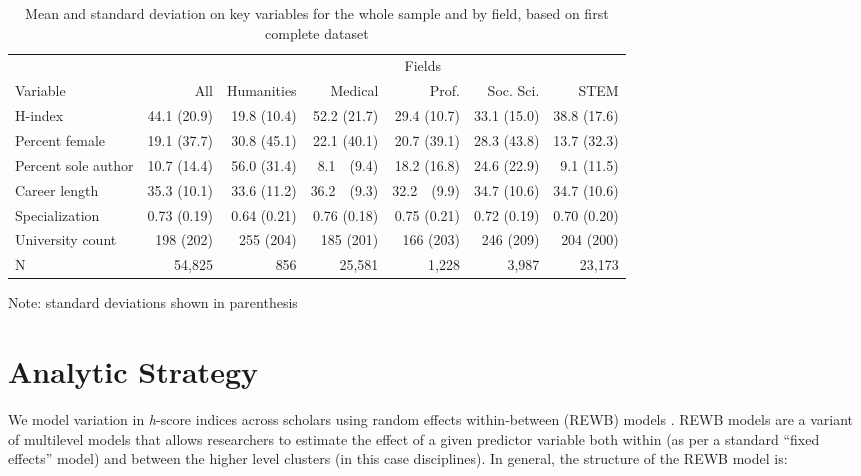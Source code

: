 \documentclass[
  10pt,
  letterpaper,
]{article}
\begin{document}
\hypertarget{tbl-desc}{}
\setlength{\LTpost}{0mm}
\begin{table}
\begin{adjustwidth}{-1.5in}{0in} %
\caption{\label{tbl-desc}Mean and standard deviation on key variables for the whole sample and by
field, based on first complete dataset }\tabularnewline
\begin{tabular}{lrrrrrr}
\hline
 &  & \multicolumn{5}{c}{Fields} \\ 
Variable & All & Humanities & Medical & Prof. & Soc. Sci. & STEM \\ 
\hline
H-index & 44.1 (20.9) & 19.8 (10.4) & 52.2 (21.7) & 29.4 (10.7) & 33.1 (15.0) & 38.8 (17.6) \\ 
Percent female & 19.1 (37.7) & 30.8 (45.1) & 22.1 (40.1) & 20.7 (39.1) & 28.3 (43.8) & 13.7 (32.3) \\ 
Percent sole author & 10.7 (14.4) & 56.0 (31.4) & 8.1~~(9.4) & 18.2 (16.8) & 24.6 (22.9) & 9.1 (11.5) \\ 
Career length & 35.3 (10.1) & 33.6 (11.2) & 36.2~~(9.3) & 32.2~~(9.9) & 34.7 (10.6) & 34.7 (10.6) \\ 
Specialization & 0.73 (0.19) & 0.64 (0.21) & 0.76 (0.18) & 0.75 (0.21) & 0.72 (0.19) & 0.70 (0.20) \\ 
University count & 198 (202) & 255 (204) & 185 (201) & 166 (203) & 246 (209) & 204 (200) \\ 
N & 54,825 & 856 & 25,581 & 1,228 & 3,987 & 23,173 \\ 
\hline
\end{tabular}
\begin{minipage}{\linewidth}
Note: standard deviations shown in parenthesis\\
\end{minipage}
\end{adjustwidth}
\end{table}


\hypertarget{analytic-strategy}{%
\section{Analytic Strategy}\label{analytic-strategy}}

We model variation in \emph{h}-score indices across scholars using
random effects within-between (REWB) models \citep{bell_fixed_2019}.
REWB models are a variant of multilevel models that allows researchers
to estimate the effect of a given predictor variable both within (as per
a standard ``fixed effects'' model) and between the higher level
clusters (in this case disciplines). In general, the structure of the
REWB model is:
\end{document}

